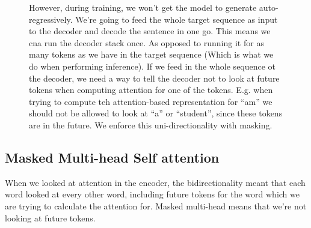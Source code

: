 \documentclass[11pt]{article}
\begin{document}
\begin{figure}[H]
    \centering
    \caption*{However, during training, we won't get the model to generate auto-regressively. We're going to feed the whole target sequence as input to the decoder and decode the sentence in one go. This means we cna run the decoder stack once. As opposed to running it for as many tokens as we have in the target sequence (Which is what we do when performing inference). If we feed in the whole sequence ot the decoder, we need a way to tell the decoder not to look at future tokens when computing attention for one of the tokens. E.g. when trying to compute teh attention-based representation for ``am'' we should not be allowed to look at ``a'' or ``student'', since these tokens are in the future. We enforce this uni-directionality with masking.}
\end{figure}

\subsection{Masked Multi-head Self attention}

When we looked at attention in the encoder, the bidirectionality meant that each word looked at every other word, including future tokens for the word which we are trying to calculate the attention for. Masked multi-head means that we're not looking at future tokens. 
\end{document}
